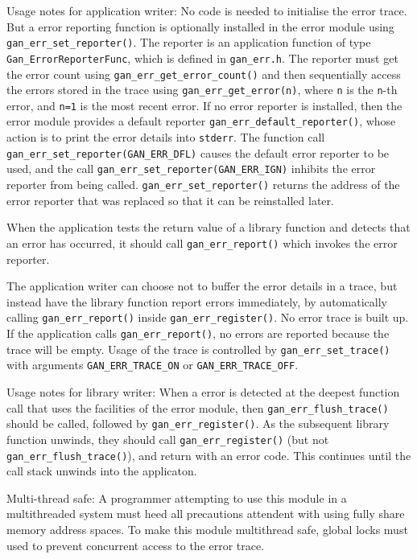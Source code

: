 Usage notes for application writer: No
code is needed to initialise the error trace. But a error reporting
function is optionally installed in the error module using
{\tt gan\_err\_set\_reporter()}. The reporter is an application function of
type {\tt Gan\_ErrorReporterFunc}, which is defined in {\tt gan\_err.h}. The
reporter must get the error count using {\tt gan\_err\_get\_error\_count()}
and then sequentially access the errors stored in the trace using
{\tt gan\_err\_get\_error(n)}, where {\tt n} is the {\tt n}-th error,
and {\tt n=1} is the most
recent error. If no error reporter is installed, then the error
module provides a default reporter {\tt gan\_err\_default\_reporter()}, whose
action is to print the error details into {\tt stderr}. The function call
{\tt gan\_err\_set\_reporter(GAN\_ERR\_DFL)} causes the default error reporter
to be used, and the call {\tt gan\_err\_set\_reporter(GAN\_ERR\_IGN)} inhibits
the error reporter from being called. {\tt gan\_err\_set\_reporter()} returns
the address of the error reporter that was replaced so that it can
be reinstalled later.

When the application tests the return value of a library function
and detects that an error has occurred, it should call {\tt gan\_err\_report()}
which invokes the error reporter.

The application writer can choose not to buffer the error details in
a trace, but instead have the library function report errors
immediately, by automatically calling {\tt gan\_err\_report()} inside
{\tt gan\_err\_register()}. No error trace is built up. If the application
calls {\tt gan\_err\_report()}, no errors are reported because the trace will
be empty. Usage of the trace is controlled by {\tt gan\_err\_set\_trace()} with
arguments {\tt GAN\_ERR\_TRACE\_ON} or {\tt GAN\_ERR\_TRACE\_OFF}.

Usage notes for library writer: When a
error is detected at the deepest function call that uses the
facilities of the error module, then {\tt gan\_err\_flush\_trace()} should be
called, followed by {\tt gan\_err\_register()}. As the subsequent library
function unwinds, they should call {\tt gan\_err\_register()} (but not
{\tt gan\_err\_flush\_trace()}), and return with an error code. This
continues until the call stack unwinds into the applicaton.

Multi-thread safe: A programmer attempting to use this module in a
multithreaded system must heed all precautions attendent with using
fully share memory address spaces. To make this module multithread
safe, global locks must used to prevent concurrent access to the
error trace.

